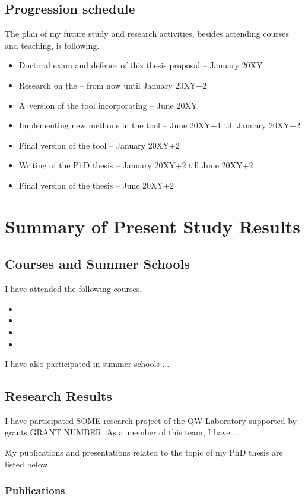 \documentclass[11pt,a4paper]{report}
\newcounter{counter}[section]
\begin{document}
\section{Progression schedule}
The plan of my future study and research activities, besides attending
courses and teaching, is following.
\begin{itemize}
\item Doctoral exam and defence of this thesis proposal -- January 20XY
\item Research on the  -- from now until January 20XY+2
\item A~version of the tool incorporating -- June 20XY
\item Implementing new methods in the tool -- June 20XY+1 till January 20XY+2
\item Final version of the tool -- January 20XY+2
\item Writing of the PhD thesis -- January 20XY+2 till June 20XY+2
\item Final version of the thesis -- June 20XY+2
\end{itemize}


\newpage
{}





\appendix

\chapter{Summary of Present Study Results}\label{app:results}

\section{Courses and Summer Schools}
I have attended the following courses.
\begin{itemize}
\item 
\item 
\item 
\item 
\end{itemize}

I have also participated in summer schools ...

\section{Research Results}

I have participated  SOME research project of the QW Laboratory supported by grants
GRANT NUMBER. As a~member of this team, I have ...

 My publications and presentations related
to the topic of my PhD thesis are listed below.

\subsection*{Publications}
\end{document}
